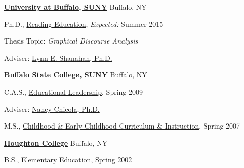\href{http://www.buffalo.edu/}{\textbf{University at Buffalo, SUNY}}
Buffalo, NY
\begin{outerlist}

\item[] Ph.D.,
        \href{http://gse.buffalo.edu/lai/doc}
             {Reading Education},
             \emph{Expected:} Summer 2015
        \begin{innerlist}
        \item Thesis Topic: \emph{Graphical Discourse Analysis}
        \item Adviser:
              \href{http://gse.buffalo.edu/about/directory/faculty/2110}
                   {Lynn E. Shanahan, Ph.D.}
        \end{innerlist}
\end{outerlist}
\vspace{.1in}

\href{http://www.buffalostate.edu/}{\textbf{Buffalo State College, SUNY}}
Buffalo, NY
\begin{outerlist}

\item[] C.A.S.,
        \href{http://www.buffalostate.edu/gradprog.xml?bpid=27}
             {Educational Leadership},
             Spring 2009
        \begin{innerlist}
        \item Adviser:
              \href{http://elementaryeducation.buffalostate.edu/faculty/nancy-chicola}
                   {Nancy Chicola, Ph.D.}
        \end{innerlist}
\end{outerlist}
\vspace{.1in}

\begin{outerlist}

\item[] M.S.,
        \href{http://www.buffalostate.edu/gradprog.xml?bpid=27}
             {Childhood \& Early Childhood Curriculum \& Instruction},
             Spring 2007
\end{outerlist}
\vspace{.1in}

\href{http://www.houghton.edu/}{\textbf{Houghton College}}
Buffalo, NY
\begin{outerlist}

\item[] B.S.,
        \href{http://www.houghton.edu/education/}
             {Elementary Education},
             Spring 2002
\end{outerlist}
\vspace{.1in}


